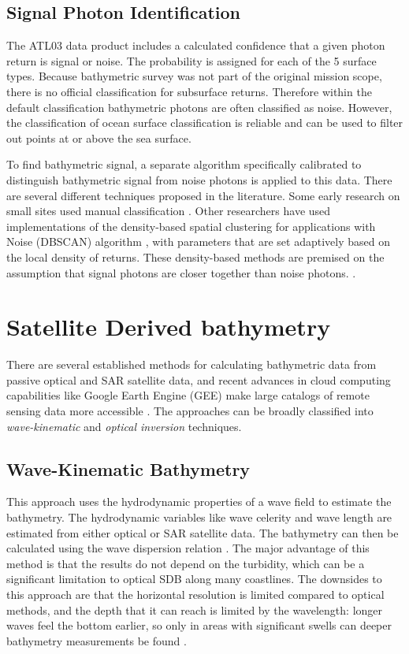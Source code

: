\subsection{Signal Photon Identification}
\label{subsec:denoising}
The ATL03 data product includes a calculated confidence that a given photon return is signal or noise. The probability is assigned for each of the 5 surface types. Because bathymetric survey was not part of the original mission scope, there is no official classification for subsurface returns. Therefore within the default classification bathymetric photons are often classified as noise. However, the classification of ocean surface classification is reliable \parencite{}  and can be used to filter out points at or above the sea surface. 

To find bathymetric signal, a separate algorithm specifically calibrated to distinguish bathymetric signal from noise photons is applied to this data. There are several different techniques proposed in the literature.  Some early research on small sites used manual classification \parencite{Forfinski-Sarkozi2016}. Other researchers have used implementations of the density-based spatial clustering for applications with Noise (DBSCAN) algorithm \parencite{Ester1996}, with parameters that are set adaptively based on the local density of returns. These density-based methods are premised on the assumption that signal photons are closer together than noise photons. \parencite{Neuenschwander2019}.


\section{Satellite Derived bathymetry}
There are several established methods for calculating bathymetric data from passive optical and SAR satellite data, and recent advances in cloud computing capabilities like Google Earth Engine (GEE) \parencite{Gorelick2017a} make large catalogs of remote sensing data more accessible \parencite{Pike2019,Turner2021}. The approaches can be broadly classified into \emph{wave-kinematic} and \emph{optical inversion} techniques.

\subsection{Wave-Kinematic Bathymetry}
This approach uses the hydrodynamic properties of a wave field to estimate the bathymetry. The hydrodynamic variables like wave celerity and wave length are estimated from either optical or SAR satellite data. The bathymetry can then be calculated using the wave dispersion relation \cite{Almar2021e}. The major advantage of this method is that the results do not depend on the turbidity, which can be a significant limitation to optical SDB along many coastlines. The downsides to this approach are that the horizontal resolution is limited compared to optical methods, and the depth that it can reach is limited by the wavelength: longer waves feel the bottom earlier, so only in areas with significant swells can deeper bathymetry measurements be found \parencite{Almar2021e}.

